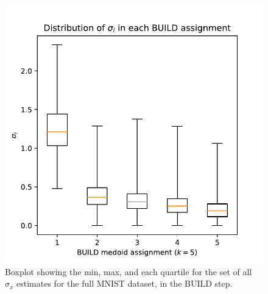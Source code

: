 

\begin{figure}[h!]
    \centering
    \includegraphics[scale=0.5]{figures/MNIST_sigmas_example.pdf}
    \caption{Boxplot showing the min, max, and each quartile for the set of all $\sigma_x$ estimates for the full MNIST dataset, in the BUILD step. } 
    \label{fig:MNIST_sigmas_example}
\end{figure}


